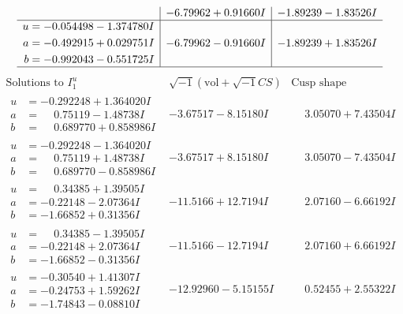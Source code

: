 \documentclass[1p]{elsarticle_modified}
\theoremstyle{definition}
\newcommand{\I}{\sqrt{-1}}
\begin{document}
$$\begin{array}{c|c|c}
 & -6.79962 + 0.91660 I & -1.89239 - 1.83526 I \\ \hline\begin{aligned}
u &= -0.054498 - 1.374780 I \\
a &= -0.492915 + 0.029751 I \\
b &= -0.992043 - 0.551725 I\end{aligned}
 & -6.79962 - 0.91660 I & -1.89239 + 1.83526 I\\
 \hline 
 \end{array}$$\newpage$$\begin{array}{c|c|c}  
\text{Solutions to }I^u_{1}& \I (\text{vol} + \sqrt{-1}CS) & \text{Cusp shape}\\
 \hline 
\begin{aligned}
u &= -0.292248 + 1.364020 I \\
a &= \phantom{-}0.75119 - 1.48738 I \\
b &= \phantom{-}0.689770 + 0.858986 I\end{aligned}
 & -3.67517 - 8.15180 I & \phantom{-}3.05070 + 7.43504 I \\ \hline\begin{aligned}
u &= -0.292248 - 1.364020 I \\
a &= \phantom{-}0.75119 + 1.48738 I \\
b &= \phantom{-}0.689770 - 0.858986 I\end{aligned}
 & -3.67517 + 8.15180 I & \phantom{-}3.05070 - 7.43504 I \\ \hline\begin{aligned}
u &= \phantom{-}0.34385 + 1.39505 I \\
a &= -0.22148 - 2.07364 I \\
b &= -1.66852 + 0.31356 I\end{aligned}
 & -11.5166 + 12.7194 I & \phantom{-}2.07160 - 6.66192 I \\ \hline\begin{aligned}
u &= \phantom{-}0.34385 - 1.39505 I \\
a &= -0.22148 + 2.07364 I \\
b &= -1.66852 - 0.31356 I\end{aligned}
 & -11.5166 - 12.7194 I & \phantom{-}2.07160 + 6.66192 I \\ \hline\begin{aligned}
u &= -0.30540 + 1.41307 I \\
a &= -0.24753 + 1.59262 I \\
b &= -1.74843 - 0.08810 I\end{aligned}
 & -12.92960 - 5.15155 I & \phantom{-}0.52455 + 2.55322 I \\ \hline\begin{aligned}

\end{aligned}
\end{array}$$
\end{document}
